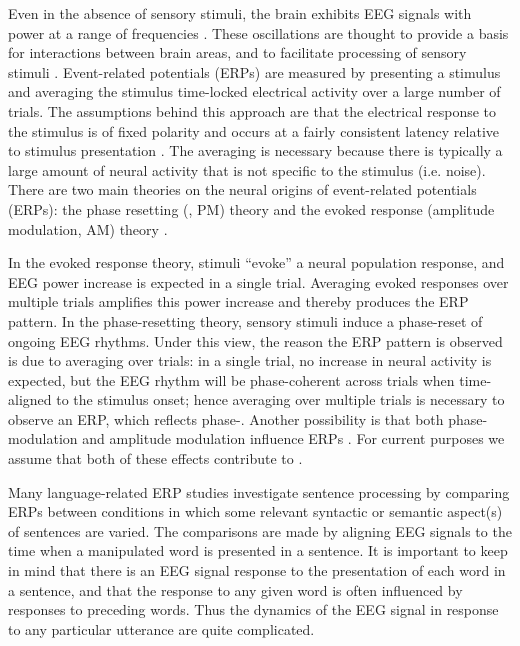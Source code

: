 Even in the absence of sensory stimuli, the brain exhibits EEG signals with power at a range of frequencies \citep{Buzsaki2006}. These oscillations are thought to provide a basis for interactions between brain areas, and to facilitate processing of sensory stimuli \citep{FriesEtAl2001,GrayEtAl1989}. Event-related potentials (ERPs) are measured by presenting a stimulus and averaging the stimulus time-locked electrical activity over a large number of trials. The assumptions behind this approach are that the electrical response to the stimulus is of fixed polarity and occurs at a fairly consistent latency relative to stimulus presentation \citep{PennyEtAl2002}. The averaging is necessary because there is typically a large amount of neural activity that is not specific to the stimulus (i.e. noise). There are two main theories on the neural origins of event-related potentials (ERPs): the phase resetting (, PM) theory and the evoked response (amplitude modulation, AM) theory \citep{MakeigEtAl2002,PennyEtAl2002,ShahEtAl2004}.

In the evoked response theory, stimuli “evoke” a neural population response, and EEG power increase is expected in a single trial. Averaging evoked responses over multiple trials amplifies this power increase and thereby produces the ERP pattern. In the phase-resetting theory, sensory stimuli induce a phase-reset of ongoing EEG rhythms. Under this view, the reason the ERP pattern is observed is due to averaging over trials: in a single trial, no increase in neural activity is expected, but the EEG rhythm will be phase-coherent across trials when time-aligned to the stimulus onset; hence averaging over multiple trials is necessary to observe an ERP, which reflects phase-. Another possibility is that both phase-modulation and amplitude modulation influence ERPs \citep{PennyEtAl2002,ShahEtAl2004}. For current purposes we assume that both of these effects contribute to . 

  Many language-related ERP studies investigate sentence processing by comparing ERPs between conditions in which some relevant syntactic or semantic aspect(s) of sentences are varied. The comparisons are made by aligning EEG signals to the time when a manipulated word is presented in a sentence. It is important to keep in mind that there is an EEG signal response to the presentation of each word in a sentence, and that the response to any given word is often influenced by responses to preceding words. Thus the dynamics of the EEG signal in response to any particular utterance are quite complicated. 


